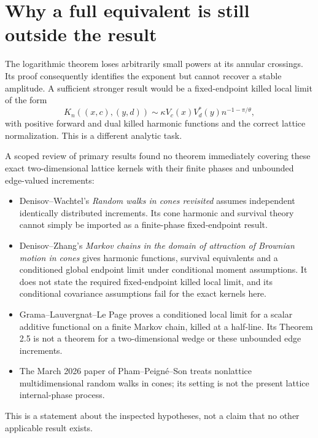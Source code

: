 \documentclass[11pt,letterpaper]{article}
\numberwithin{equation}{section}
\theoremstyle{remark}\newtheorem{remark}[theorem]{Remark}
\begin{document}
\section{Why a full equivalent is still outside the result}\label{cps:log:sec:literature}
The logarithmic theorem loses arbitrarily small powers at its annular
crossings. Its proof consequently identifies the exponent but cannot
recover a stable amplitude. A sufficient stronger result would be a
fixed-endpoint killed local limit of the form
\[
 K_n((x,c),(y,d))\sim\kappa V_c(x)V_d^*(y)n^{-1-\pi/\theta},
\]
with positive forward and dual killed harmonic functions and the
correct lattice normalization. This is a different analytic task.

A scoped review of primary results found no theorem immediately
covering these exact two-dimensional lattice kernels with their
finite phases and unbounded edge-valued increments:
\begin{itemize}
\item Denisov--Wachtel's \emph{Random walks in cones revisited}
\cite{DWrevisited} assumes independent identically distributed increments.
Its cone harmonic and survival theory cannot simply be imported as
a finite-phase fixed-endpoint result.
\item Denisov--Zhang's \emph{Markov chains in the domain of attraction
of Brownian motion in cones} \cite{DZ} gives harmonic functions,
survival equivalents and a conditioned global endpoint limit under
conditional moment assumptions. It does not state the required
fixed-endpoint killed local limit, and its conditional covariance
assumptions fail for the exact kernels here.
\item Grama--Lauvergnat--Le Page \cite{GLLP} proves a conditioned
local limit for a scalar additive functional on a finite Markov
chain, killed at a half-line. Its Theorem 2.5 is not a theorem for a
two-dimensional wedge or these unbounded edge increments.
\item The March 2026 paper of Pham--Peign\'e--Son \cite{PPS} treats
nonlattice multidimensional random walks in cones; its setting is
not the present lattice internal-phase process.
\end{itemize}
This is a statement about the inspected hypotheses, not a claim that
no other applicable result exists.
\end{document}
